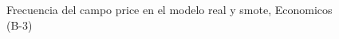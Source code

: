 \begin{figure}[H]
    \centering
    
    \caption{Frecuencia del campo  price en el modelo real y smote, Economicos (B-3)}
    \label{frecuency- Price-smote-enc}
\end{figure}